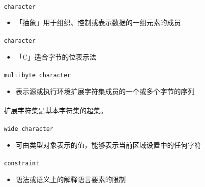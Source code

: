 \paragraph{}
\texttt{character}
\begin{itemize}
  \item[]{「抽象」用于组织、控制或表示数据的一组元素的成员}
\end{itemize}

\paragraph{}
\texttt{character}
\begin{itemize}
  \item[]{「C」适合字节的位表示法}
\end{itemize}

\paragraph{}
\texttt{multibyte character}
\begin{itemize}
  \item[]{表示源或执行环境扩展字符集成员的一个或多个字节的序列}
\end{itemize}

\paragraph{}
\notes* 扩展字符集是基本字符集的超集。

\paragraph{}
\texttt{wide character}
\begin{itemize}
  \item[]{可由类型对象表示的值，能够表示当前区域设置中的任何字符}
\end{itemize}

\paragraph{}
\texttt{constraint}
\begin{itemize}
  \item[]{语法或语义上的解释语言要素的限制}
\end{itemize}

